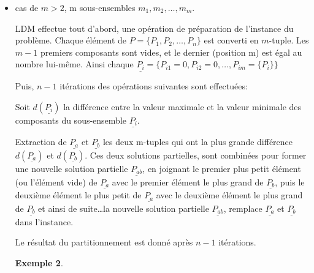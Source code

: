 \documentclass[a4paper,12pt]{report}
\theoremstyle{plain}				%
\newtheorem{example}{Exemple}
\theoremstyle{definition}				%
\begin{document}
\begin{itemize}
\begin{example}
\end{example}

\bigskip

\item cas de $m>2$, m sous-ensembles $m_1,m_2, \ldots, m_m $.

%
%
  LDM effectue tout d'abord, une opération de préparation de
  l'instance du problème.
  Chaque élément de $P = \{ P_1, P_2, \ldots, P_n \}$ est converti en
  $m$-tuple.
  Les $m-1$ premiers composants sont vides, et le dernier (position m)
  est égal au nombre lui-même.
  Ainsi chaque
  $\underline{P_i} = \{P_{i 1}=0,P_{i 2}=0, \ldots, P_{i m}=\{P_i\}
  \}$

Puis, $n-1$ itérations des opérations suivantes sont effectuées:


Soit $d(\underline{P_i})$ la différence entre la valeur maximale et la
valeur minimale des composants du sous-ensemble $\underline{P_i}$.

Extraction de $\underline{P_a}$ et $\underline{P_b}$ les deux m-tuples
qui ont la plus grande différence $d(\underline{P_a})$ et
$d(\underline{P_b})$.
Ces deux solutions partielles, sont combinées pour former une nouvelle
solution partielle $\underline{P_{ab}}$, en joignant le premier plus
petit élément (ou l'élément vide) de $\underline{P_a}$ avec le premier
élément le plus grand de $\underline{P_b}$, puis le deuxième élément
le plus petit de $\underline{P_a}$ avec le deuxième élément le plus
grand de $\underline{P_b}$ et ainsi de suite\ldots la nouvelle
solution partielle $\underline{P_{ab}}$, remplace $\underline{P_a}$ et
$\underline{P_b}$ dans l'instance.

Le résultat du partitionnement est donné après $n-1$ itérations.

\begin{example}


\end{example}
\end{itemize}
\end{document}
